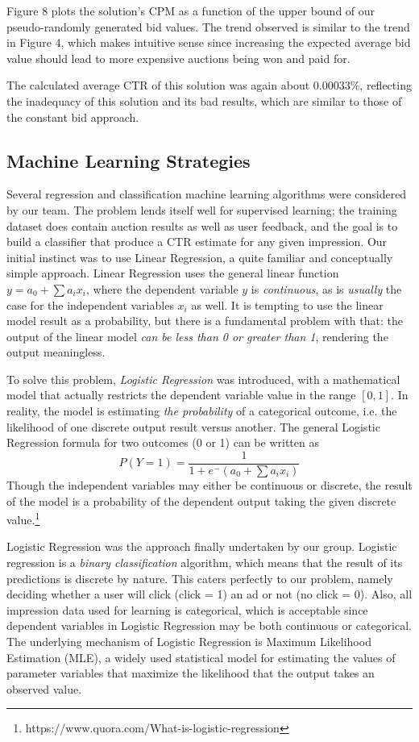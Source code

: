 \documentclass{sig-alternate-05-2015}
\begin{document}
Figure 8 plots the solution's CPM as a function of the upper bound of our pseudo-randomly generated bid values. The trend observed is similar to the trend in Figure 4, which makes intuitive sense since increasing the expected average bid value should lead to more expensive auctions being won and paid for.

The calculated average CTR of this solution was again about $0.00033\%$, reflecting the inadequacy of this solution and its bad results, which are similar to those of the constant bid approach.

\subsection{Machine Learning Strategies}
Several regression and classification machine learning algorithms were considered by our team. The problem lends itself well for supervised learning; the training dataset does contain auction results as well as user feedback, and the goal is to build a classifier that produce a CTR estimate for any given impression. Our initial instinct was to use Linear Regression, a quite familiar and conceptually simple approach. Linear Regression uses the general linear function $y = a_0 +  \sum a_i x_i$, where the dependent variable $y$ is \textit{continuous}, as is \textit{usually} the case for the independent variables $x_i$ as well. It is tempting to use the linear model result as a probability, but there is a fundamental problem with that: the output of the linear model \textit{can be less than 0 or greater than 1}, rendering the output meaningless. 

To solve this problem, \textit{Logistic Regression} was introduced, with a mathematical model that actually restricts the dependent variable value in the range $[0,1]$. In reality, the model is estimating \textit{the probability} of a categorical outcome, i.e. the likelihood of one discrete output result versus another. The general Logistic Regression formula for two outcomes (0 or 1) can be written as \[P(Y=1) = \frac{1}{1+e^-(a_0+\sum a_i x_i)}\]
Though the independent variables may either be continuous or discrete, the result of the model is a probability of the dependent output taking the given discrete value.\footnote{https://www.quora.com/What-is-logistic-regression}

Logistic Regression was the approach finally undertaken by our group. Logistic regression is a \textit{binary classification} algorithm, which means that the result of its predictions is discrete by nature. This caters perfectly to our problem, namely deciding whether a user will click (click = 1) an ad or not (no click = 0). Also, all impression data used for learning is categorical, which is acceptable since dependent variables in Logistic Regression may be both continuous or categorical. The underlying mechanism of Logistic Regression is Maximum Likelihood Estimation (MLE), a widely used statistical model for estimating the values of parameter variables that maximize the likelihood that the output takes an observed value. 
\end{document}
